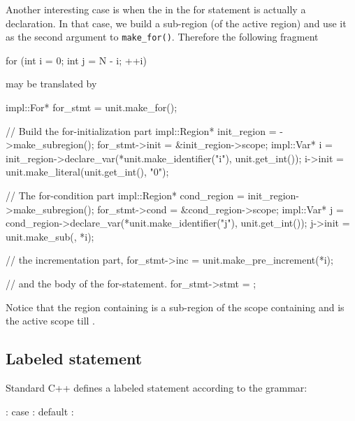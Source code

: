 \documentclass[a4paper,12pt]{article}
\begin{document}
Another interesting case is when the  in the for statement
is actually a declaration.  In that case, we build a sub-region (of the active
region) and use it as the second argument to \texttt{make\_for()}. Therefore
the following fragment
\begin{Program}
  for (int i = 0; int j = N - i; ++i)
\end{Program}
may be translated by
\begin{Program}
  impl::For* for_stmt = unit.make_for();

  // Build the for-initialization part
  impl::Region* init_region = ->make_subregion();
  for_stmt->init = &init_region->scope;
  impl::Var* i = init_region->declare_var(*unit.make_identifier("i"),
                                          unit.get_int());
  i->init = unit.make_literal(unit.get_int(), "0");

  // The for-condition part
  impl::Region* cond_region = init_region->make_subregion();
  for_stmt->cond = &cond_region->scope;
  impl::Var* j = cond_region->declare_var(*unit.make_identifier("j"),
                                          unit.get_int());
  j->init = unit.make_sub(, *i);

  // the incrementation part,
  for_stmt->inc = unit.make_pre_increment(*i);

  // and the body of the for-statement.
  for_stmt->stmt = ;
\end{Program}
Notice that the region containing  is a sub-region of the scope
containing  and is the active scope till .


\subsection{Labeled statement}
\label{sec:stmt.labeled}

Standard C++ defines a labeled statement according to the grammar:
\begin{Grammar}
       : 
      case  : 
      default : 
\end{Grammar}
\end{document}
